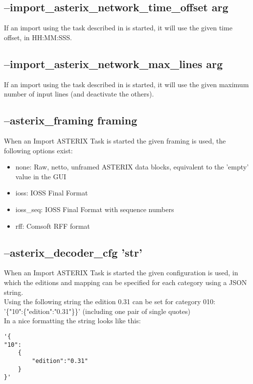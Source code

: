 \subsection{--import\_asterix\_network\_time\_offset arg}

If an import using the task described in  is started, it will use the given time offset, in HH:MM:SSS.

\subsection{--import\_asterix\_network\_max\_lines arg}

If an import using the task described in  is started, it will use the given maximum number of input lines (and deactivate the others).

\subsection{--asterix\_framing framing}

When an Import ASTERIX Task is started the given framing is used, the following options exist:

\begin{itemize}
\item none:  Raw, netto, unframed ASTERIX data blocks, equivalent to the 'empty' value in the GUI
\item ioss:  IOSS Final Format
\item ioss\_seq: IOSS Final Format with sequence numbers
\item rff: Comsoft RFF format
\end{itemize}

\subsection{--asterix\_decoder\_cfg 'str'}

When an Import ASTERIX Task is started the given configuration is used, in which the editions and mapping can be specified for each category using a JSON string. \\

Using the following string the edition 0.31 can be set for category 010:  \\
'\{"10":\{"edition":"0.31"\}\}' (including one pair of single quotes) \\

In a nice formatting the string looks like this:
\begin{lstlisting}[basicstyle=\small\ttfamily]
'{
"10":
    {
        "edition":"0.31"
    }
}'
\end{lstlisting}
\ \\

